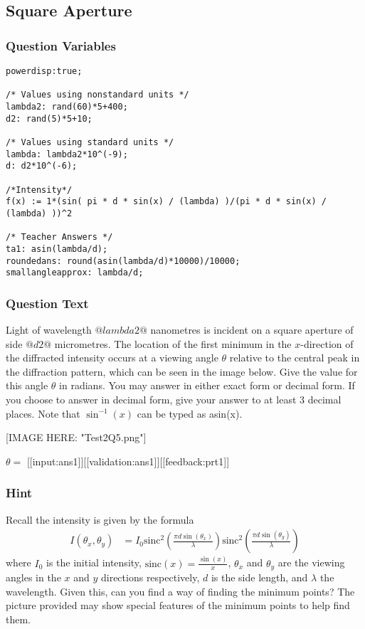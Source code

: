 \documentclass[a4paper,10pt]{article}
\begin{document}
\subsection{Square Aperture}
\subsubsection{Question Variables}
\begin{lstlisting}
powerdisp:true;

/* Values using nonstandard units */
lambda2: rand(60)*5+400;
d2: rand(5)*5+10;

/* Values using standard units */
lambda: lambda2*10^(-9);
d: d2*10^(-6);

/*Intensity*/
f(x) := 1*(sin( pi * d * sin(x) / (lambda) )/(pi * d * sin(x) / (lambda) ))^2

/* Teacher Answers */
ta1: asin(lambda/d);
roundedans: round(asin(lambda/d)*10000)/10000;
smallangleapprox: lambda/d;
\end{lstlisting}
\subsubsection{Question Text}
Light of wavelength \(@lambda2@\) nanometres is incident on a square aperture of side \(@d2@\) micrometres. The location of the first minimum in the \(x\)-direction of the diffracted intensity occurs at a viewing angle \(\theta\) relative to the central peak in the diffraction pattern, which can be seen in the image below. Give the value for this angle \(\theta\) in radians. You may answer in either exact form or decimal form. If you choose to answer in decimal form, give your answer to at least 3 decimal places. Note that \(\sin^{-1}(x)\) can be typed as asin(x).

[IMAGE HERE: "Test2Q5.png"]

\(\theta = \) [[input:ans1]][[validation:ans1]][[feedback:prt1]]
\subsubsection{Hint}
Recall the intensity is given by the formula \begin{align*} I(\theta_x, \theta_y) &= I_0 \text{sinc}^2\left(\frac{\pi d \sin(\theta_x)}{\lambda}\right) \text{sinc}^2\left(\frac{\pi d \sin(\theta_y)}{\lambda}\right) \end{align*} where $I_0$ is the initial intensity, $\text{sinc}(x)=\frac{\sin(x)}{x}$, $\theta_x$ and $\theta_y$ are the viewing angles in the $x$ and $y$ directions respectively, $d$ is the side length, and $\lambda$ the wavelength. Given this, can you find a way of finding the minimum points? The picture provided may show special features of the minimum points to help find them.
\end{document}
